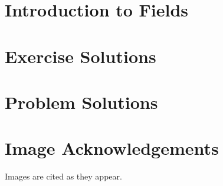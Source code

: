 
\usepackage{xr}

\newcommand{\version}{0.1}
\newcommand{\volumenumber}{3}
\newcommand{\volumename}{Fields}

\newcommand{\quotepagetext}{
    I became convinced that studying the algebraic relationship of numbers is most conveniently based on a concept that is directly connected with the simplest arithmetic properties. I had originally used the term ``rational domain'', which I later changed to ``field''.
}
\newcommand{\quotepageattribution}{Richard Dedekind, 1871}
\newcommand{\quotepagecitation}{\cite[p.~66]{kleiner_2007}}

\newcommand{\prefacevolumetext}{
    We cover field theory essentials in Volume III. %
}

\linespread{1.05}




\frontmatterpages  %

\chapter{Introduction to Fields}

\appendix
\chapter{Exercise Solutions}

\chapter{Problem Solutions}

\chapter{Image Acknowledgements}
Images are cited as they appear.

\printbibliography[heading=bibintoc, title={References and Bibliography}]


